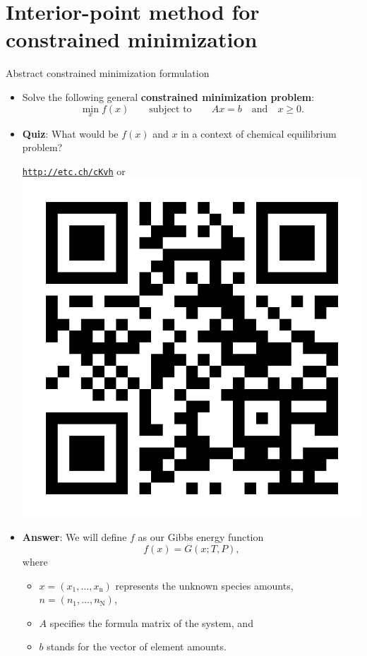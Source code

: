 \section{Interior-point method for constrained minimization}
%
%
\begin{frame}{Abstract constrained minimization formulation}
	\small
\begin{itemize}
\item Solve the following general \alert{\bf constrained minimization problem}:
\[
\min_{x}f(x)\qquad\text{subject to}\qquad Ax=b\quad\text{and}\quad x\geq0.
\]
\vskip -10pt
\pause
\item \alert{\textbf{Quiz}}: What would be $f(x)$ and $x$ in a context of chemical equilibrium problem?
%
\begin{center}
	\href{http://etc.ch/cKvh}{\textcolor{indigo(dye)}{\tt http://etc.ch/cKvh}} \quad or \quad 
	\includegraphics[height=0.13\columnwidth]{figures/numerical-methods-chemical-equilibrium/polls.png}
\end{center}
\hiddenpause
\item \alert{\textbf{Answer}}: We will define $f$ as our Gibbs energy function
\[
f(x)=G(x;T,P),
\]
\vskip -10pt
where 
\begin{itemize}
\item $x=(x_{1},\ldots,x_{\text{n}})$ represents the \alert{unknown
species amounts}, ${n=(n_{1},\ldots,n_{\text{N}})}$, 
\item $A$ specifies the \alert{formula matrix of the system}, and 
\item $b$ stands for the \alert{vector of element amounts}.
\end{itemize}
\end{itemize}
\end{frame}
%
